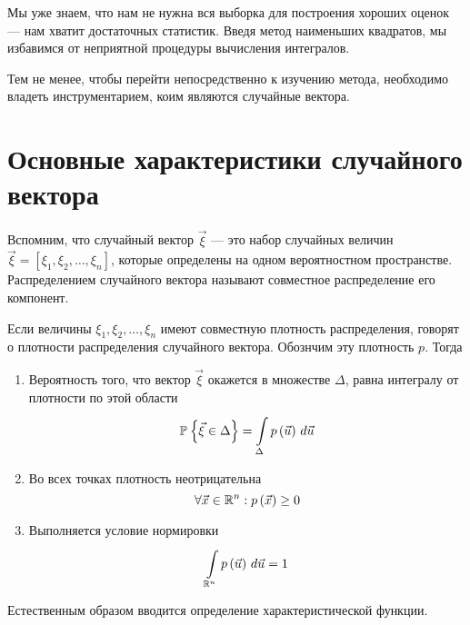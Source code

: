 Мы уже знаем, что нам не нужна вся выборка для построения хороших оценок ---
нам хватит достаточных статистик. Введя метод наименьших квадратов,
мы избавимся от неприятной процедуры вычисления интегралов.

Тем не менее, чтобы перейти непосредственно к изучению метода, необходимо
владеть инструментарием, коим являются случайные вектора.

\section{Основные характеристики случайного вектора}

Вспомним, что случайный вектор $\vec{\xi}$ --- это набор случайных величин
$\vec{\xi} = \left[ \xi_1, \xi_2, \dots, \xi_n \right]$, которые определены
на одном вероятностном пространстве.
Распределением случайного вектора называют совместное распределение его
компонент.

Если величины $\xi_1, \xi_2, \dots, \xi_n$ имеют совместную плотность
распределения, говорят о плотности распределения случайного вектора.
Обознчим эту плотность $p$. Тогда
\begin{enumerate}
  \item Вероятность того, что вектор $\vec{\xi}$ окажется
    в множестве $\Delta$, равна интегралу от плотности по этой области
    \begin{equation*}
      \Probability{\vec{\xi} \in \Delta}
      = \integrall{\Delta}{d\vec{u}}{\pdf{\vec{u}}}
    \end{equation*}
  \item Во всех точках плотность неотрицательна
    \begin{equation*}
      \forall \vec{x} \in \mathbb{R}^n: \pdf{\vec{x}} \ge 0
    \end{equation*}
  \item Выполняется условие нормировки
    \begin{equation*}
      \integrall{\mathbb{R}^n}{d\vec{u}}{\pdf{\vec{u}}} = 1
    \end{equation*}
\end{enumerate}

Естественным образом вводится определение характеристической функции.

